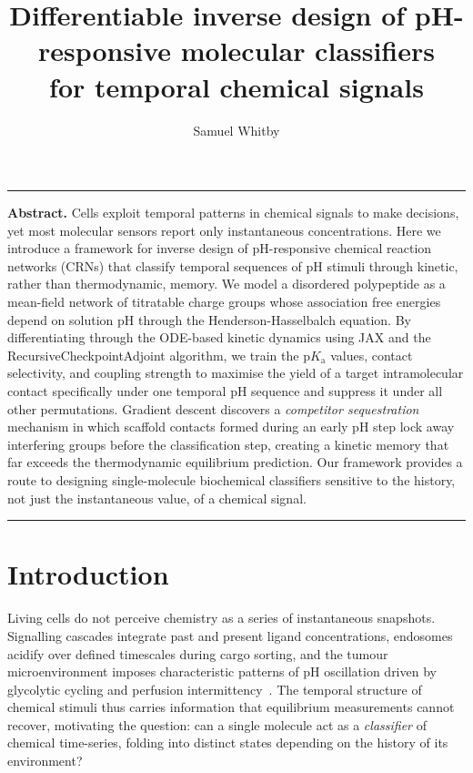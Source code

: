 \documentclass[10pt,twocolumn]{article}
\title{\vspace{-1em}%
  \textbf{Differentiable inverse design of pH-responsive molecular classifiers\\
  for temporal chemical signals}}
\author[1]{Samuel Whitby}
\affil[1]{\small Department of [DEPARTMENT], University of [UNIVERSITY]}
\date{}
\begin{document}
\maketitle
\vspace{-1.5em}

\begin{center}
  \rule{\columnwidth}{0.4pt}
  \vspace{2pt}
\end{center}
\noindent
\textbf{Abstract.}\;
Cells exploit temporal patterns in chemical signals to make decisions, yet most molecular sensors report only instantaneous concentrations.
Here we introduce a framework for inverse design of pH-responsive chemical reaction networks (CRNs) that classify temporal sequences of pH stimuli through kinetic, rather than thermodynamic, memory.
We model a disordered polypeptide as a mean-field network of titratable charge groups whose association free energies depend on solution pH through the Henderson-Hasselbalch equation.
By differentiating through the ODE-based kinetic dynamics using JAX and the RecursiveCheckpointAdjoint algorithm, we train the $\mathrm{p}K_\mathrm{a}$ values, contact selectivity, and coupling strength to maximise the yield of a target intramolecular contact specifically under one temporal pH sequence and suppress it under all other permutations.
Gradient descent discovers a \emph{competitor sequestration} mechanism in which scaffold contacts formed during an early pH step lock away interfering groups before the classification step, creating a kinetic memory that far exceeds the thermodynamic equilibrium prediction.
Our framework provides a route to designing single-molecule biochemical classifiers sensitive to the history, not just the instantaneous value, of a chemical signal.
\begin{center}
  \rule{\columnwidth}{0.4pt}
\end{center}

\section{Introduction}

Living cells do not perceive chemistry as a series of instantaneous snapshots.
Signalling cascades integrate past and present ligand concentrations, endosomes acidify over defined timescales during cargo sorting, and the tumour microenvironment imposes characteristic patterns of pH oscillation driven by glycolytic cycling and perfusion intermittency~\cite{ruff2025,moses2020}.
The temporal structure of chemical stimuli thus carries information that equilibrium measurements cannot recover, motivating the question: can a single molecule act as a \emph{classifier} of chemical time-series, folding into distinct states depending on the history of its environment?
\end{document}
